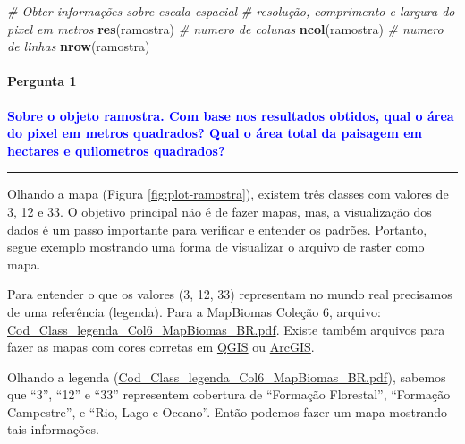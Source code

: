 \documentclass[
]{article}
\newenvironment{Shaded}{\begin{snugshade}}{\end{snugshade}}
\newcommand{\CommentTok}[1]{\textcolor[rgb]{0.56,0.35,0.01}{\textit{#1}}}
\newcommand{\FunctionTok}[1]{\textcolor[rgb]{0.13,0.29,0.53}{\textbf{#1}}}
\newcommand{\NormalTok}[1]{#1}
\begin{document}
\begin{Shaded}
\begin{Highlighting}[]
\CommentTok{\# Obter informações sobre escala espacial}
\CommentTok{\# resolução, comprimento e largura do pixel em metros}
\FunctionTok{res}\NormalTok{(ramostra)}
\CommentTok{\# numero de colunas}
\FunctionTok{ncol}\NormalTok{(ramostra)}
\CommentTok{\# numero de linhas}
\FunctionTok{nrow}\NormalTok{(ramostra)}
\end{Highlighting}
\end{Shaded}

\hypertarget{pergunta-1}{%
\paragraph{Pergunta 1}\label{pergunta-1}}

\textcolor{blue}{\textbf{Sobre o objeto ramostra. Com base nos resultados obtidos, qual o área do pixel em metros quadrados? Qual o área total da paisagem em hectares e quilometros quadrados?}}

\begin{center}\rule{0.5\linewidth}{0.5pt}\end{center}

\newpage

Olhando a mapa (Figura \ref{fig:plot-ramostra}), existem três classes com valores de 3, 12 e 33. O objetivo principal não é de fazer mapas, mas, a visualização dos dados é um passo importante para verificar e entender os padrões. Portanto, segue exemplo mostrando uma forma de visualizar o arquivo de raster como mapa.

Para entender o que os valores (3, 12, 33) representam no mundo real precisamos de uma referência (legenda). Para a MapBiomas Coleção 6, arquivo: \href{https://mapbiomas-br-site.s3.amazonaws.com/downloads/Colecction\%206/Cod_Class_legenda_Col6_MapBiomas_BR.pdf}{Cod\_Class\_legenda\_Col6\_MapBiomas\_BR.pdf}. Existe também arquivos para fazer as mapas com cores corretas em \href{https://mapbiomas-br-site.s3.amazonaws.com/downloads/Colecction\%206/MapBiomas_Col6_classes_colors.qml}{QGIS} ou \href{https://mapbiomas-br-site.s3.amazonaws.com/downloads/Colecction\%206/Legenda_Col6_MapBiomas.lyr}{ArcGIS}.

Olhando a legenda (\href{https://mapbiomas-br-site.s3.amazonaws.com/downloads/Colecction\%206/Cod_Class_legenda_Col6_MapBiomas_BR.pdf}{Cod\_Class\_legenda\_Col6\_MapBiomas\_BR.pdf}), sabemos que ``3'', ``12'' e ``33'' representem cobertura de ``Formação Florestal'', ``Formação Campestre'', e ``Rio, Lago e Oceano''. Então podemos fazer um mapa mostrando tais informações.
\end{document}

